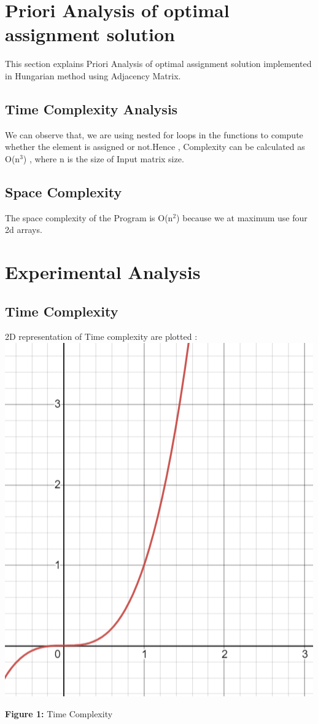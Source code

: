 \documentclass[conference]{IEEEtran}
\begin{document}
\section{Priori Analysis of optimal assignment solution}
This section explains Priori Analysis of optimal assignment solution implemented in Hungarian method using Adjacency Matrix.

\subsection{Time Complexity Analysis}

We can observe that, we are using nested for loops in the functions to compute whether the element is assigned or not.Hence , Complexity can be calculated as O(n$^{3}$) , where n is the size of Input matrix size.

\subsection{Space Complexity}

The space complexity of the Program is O(n$^{2}$) because we at maximum use four 2d arrays.

\section{Experimental Analysis}
\subsection{Time Complexity}
2D representation of Time complexity are plotted :\newline\\
\includegraphics[scale=0.65]{Time_complex.png}
\begin{center}\textbf{Figure 1:} Time Complexity \end{center}
\end{document}
